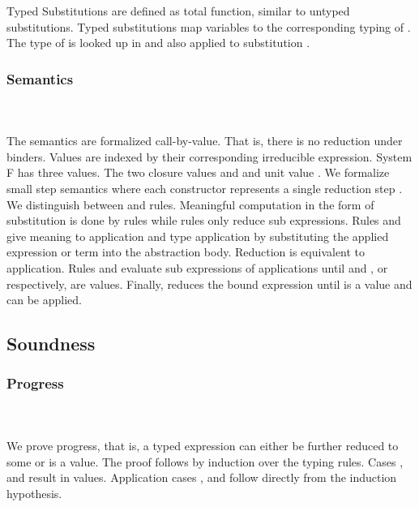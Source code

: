 \noindent Typed Substitutions are defined as total function, similar to untyped substitutions.
\FSubTyping
Typed substitutions  map variables  to the corresponding typing of . The type of  is looked up in  and also applied to substitution .
\subsubsection{Semantics}\hfill\\\\
The semantics are formalized call-by-value. That is, there is no reduction under binders. Values are indexed by their corresponding irreducible expression.
\FVal
System F has three values. The two closure values  and  and unit value .
We formalize small step semantics where each constructor represents a single reduction step   .
We distinguish between  and  rules. 
Meaningful computation in the form of substitution is done by  rules while  rules only reduce sub expressions.
\FSemantics
Rules  and  give meaning to application and type application by substituting the applied expression or term into the abstraction body. Reduction  is equivalent to application. Rules  and  evaluate sub expressions of applications until  and , or  respectively, are values. Finally,  reduces the bound expression  until  is a value and  can be applied. 

\subsection{Soundness}

\subsubsection{Progress}\hfill\\\\
We prove progress, that is, a typed expression  can either be further reduced to some  or  is a value. The proof follows by induction over the typing rules. 
\FProgress
Cases ,  and  result in values. Application cases ,  and  follow directly from the induction hypothesis. 
